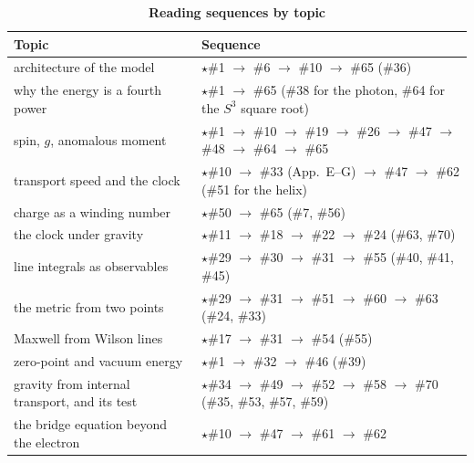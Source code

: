 \documentclass[%
 reprint, amsmath,amssymb, aps, prb, ]{revtex4-2}
\numberwithin{equation}{section}
\begin{document}
\begin{table}[t!]
\centering
\caption{\textbf{Reading sequences by topic}}
\label{tab:roadmap}
\renewcommand{\arraystretch}{1.3}
\setlength{\tabcolsep}{7pt}
\begin{tabular}{>{\raggedright\arraybackslash}p{5.6cm}>{\raggedright\arraybackslash}p{10.8cm}}
\toprule
\textbf{Topic} & \textbf{Sequence} \\
\midrule
architecture of the model & $\star$\#1 $\to$ \#6 $\to$ \#10 $\to$ \#65 (\#36) \\
why the energy is a fourth power & $\star$\#1 $\to$ \#65 (\#38 for the photon, \#64 for the $S^{3}$ square root) \\
spin, $g$, anomalous moment & $\star$\#1 $\to$ \#10 $\to$ \#19 $\to$ \#26 $\to$ \#47 $\to$ \#48 $\to$ \#64 $\to$ \#65 \\
transport speed and the clock & $\star$\#10 $\to$ \#33 (App.~E--G) $\to$ \#47 $\to$ \#62 (\#51 for the helix) \\
charge as a winding number & $\star$\#50 $\to$ \#65 (\#7, \#56) \\
the clock under gravity & $\star$\#11 $\to$ \#18 $\to$ \#22 $\to$ \#24 (\#63, \#70) \\
line integrals as observables & $\star$\#29 $\to$ \#30 $\to$ \#31 $\to$ \#55 (\#40, \#41, \#45) \\
the metric from two points & $\star$\#29 $\to$ \#31 $\to$ \#51 $\to$ \#60 $\to$ \#63 (\#24, \#33) \\
Maxwell from Wilson lines & $\star$\#17 $\to$ \#31 $\to$ \#54 (\#55) \\
zero-point and vacuum energy & $\star$\#1 $\to$ \#32 $\to$ \#46 (\#39) \\
gravity from internal transport, and its test & $\star$\#34 $\to$ \#49 $\to$ \#52 $\to$ \#58 $\to$ \#70 (\#35, \#53, \#57, \#59) \\
the bridge equation beyond the electron & $\star$\#10 $\to$ \#47 $\to$ \#61 $\to$ \#62 \\
\bottomrule
\end{tabular}
\end{table}
\end{document}
